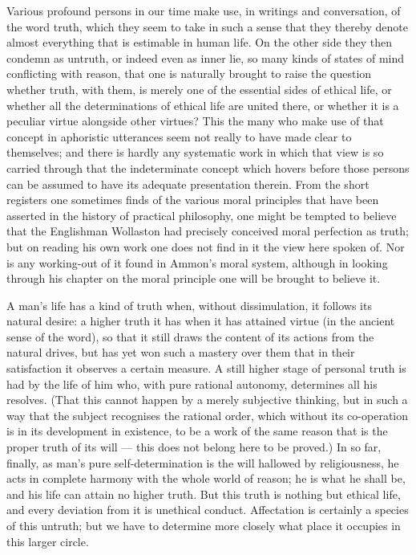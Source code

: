 \documentclass[12pt]{article}
\newcommand{\opage}[1]{\marginnote{\footnotesize\textit{[#1]}}}
\begin{document}
Various profound persons in our time make use, in writings and conversation, of the word truth, which they seem to take in such a sense that they thereby denote almost everything that is estimable in human life. On the other side they then condemn as untruth, or indeed even as inner lie, so many kinds of states of mind conflicting with reason, that one is naturally brought to raise the question whether truth, with \opage{165}them, is merely one of the essential sides of ethical life, or whether all the determinations of ethical life are united there, or whether it is a peculiar virtue alongside other virtues? This the many who make use of that concept in aphoristic utterances seem not really to have made clear to themselves; and there is hardly any systematic work in which that view is so carried through that the indeterminate concept which hovers before those persons can be assumed to have its adequate presentation therein. From the short registers one sometimes finds of the various moral principles that have been asserted in the history of practical philosophy, one might be tempted to believe that the Englishman Wollaston had precisely conceived moral perfection as truth; but on reading his own work one does not find in it the view here spoken of. Nor is any working-out of it found in Ammon's moral system, although in looking through his chapter on the moral principle one will be brought to believe it.

A man's life has a kind of truth when, without dissimulation, it follows its natural desire: a higher truth it has when it has attained virtue (in the ancient sense of the word), so that it still draws the content of its actions from the natural drives, but has yet won such a mastery over them that in their satisfaction it observes a certain measure. A still higher stage of personal truth is had by the life of him who, with pure rational autonomy, determines all his resolves. (That this cannot happen by a merely subjective thinking, but in such a way that the subject recognises the rational order, which without its co-operation is in its development in existence, to be a work of the same reason that is the proper truth of its will --- this does not belong here to be proved.) In so far, finally, as man's pure self-determination is the will hallowed by religiousness, he acts in complete harmony with the whole world of reason; he is what he shall be, and his life can \opage{166}attain no higher truth. But this truth is nothing but ethical life, and every deviation from it is unethical conduct. Affectation is certainly a species of this untruth; but we have to determine more closely what place it occupies in this larger circle.
\end{document}
